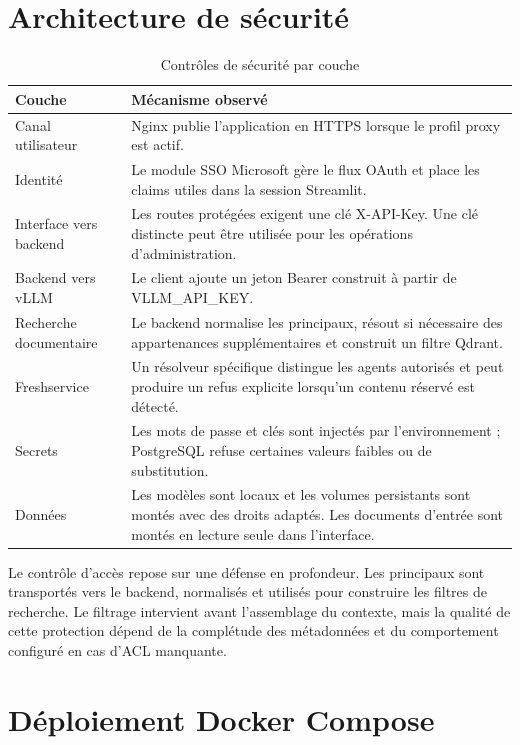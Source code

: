 
\section{Architecture de sécurité}

\begin{table}[H]
\centering
\caption{Contrôles de sécurité par couche}
\label{tab:security_ch5}
\begin{tabular}{p{3.3cm}p{10.0cm}}
\toprule
\textbf{Couche} & \textbf{Mécanisme observé} \\
\midrule
Canal utilisateur & Nginx publie l’application en HTTPS lorsque le profil proxy est actif. \\
Identité & Le module SSO Microsoft gère le flux OAuth et place les claims utiles dans la session Streamlit. \\
Interface vers backend & Les routes protégées exigent une clé X-API-Key. Une clé distincte peut être utilisée pour les opérations d’administration. \\
Backend vers vLLM & Le client ajoute un jeton Bearer construit à partir de VLLM\_API\_KEY. \\
Recherche documentaire & Le backend normalise les principaux, résout si nécessaire des appartenances supplémentaires et construit un filtre Qdrant. \\
Freshservice & Un résolveur spécifique distingue les agents autorisés et peut produire un refus explicite lorsqu’un contenu réservé est détecté. \\
Secrets & Les mots de passe et clés sont injectés par l’environnement ; PostgreSQL refuse certaines valeurs faibles ou de substitution. \\
Données & Les modèles sont locaux et les volumes persistants sont montés avec des droits adaptés. Les documents d’entrée sont montés en lecture seule dans l’interface. \\
\bottomrule
\end{tabular}
\end{table}

Le contrôle d'accès repose sur une défense en profondeur. Les principaux sont transportés vers le backend, normalisés et utilisés pour construire les filtres de recherche. Le filtrage intervient avant l'assemblage du contexte, mais la qualité de cette protection dépend de la complétude des métadonnées et du comportement configuré en cas d'ACL manquante.

\section{Déploiement Docker Compose}


